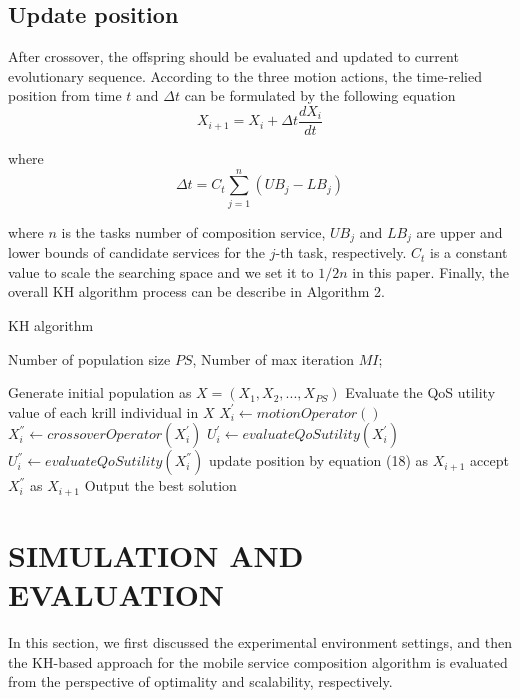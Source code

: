 \documentclass[10pt,journal,compsoc]{IEEEtran}
\begin{document}
\subsection{Update position}
After crossover, the offspring should be evaluated and updated to current evolutionary sequence.
According to the three motion actions, the time-relied position from time $t$ and $\Delta t$ can be formulated by the following equation
\begin{equation}
X_{i+1} = X_i + \Delta t \frac{dX_i}{dt}
\end{equation}

where
\begin{equation}
\Delta t = C_t\sum_{j=1}^{n}(UB_j - LB_j)
\end{equation}

where $n$ is the tasks number of composition service, $UB_j$ and $LB_j$ are upper and lower bounds of candidate services for the $j$-th task, respectively. $C_t$ is a constant value to scale the searching space and we set it to $1/2n$ in this paper. Finally, the overall KH algorithm process can be describe in Algorithm 2.

\begin{algorithm}
\caption{KH algorithm}
\label{alg2}
\begin{algorithmic}[1]

\REQUIRE Number of population size $PS$, Number of max iteration $MI$;

\STATE Generate initial population as $X = (X_1, X_2, ..., X_{PS})$
\STATE Evaluate the QoS utility value of each krill individual in $X$
		\STATE $X_i^{'} \leftarrow motionOperator()$
		\STATE $X_i^{''} \leftarrow crossoverOperator(X_i^{'})$
		\STATE $U_i^{'} \leftarrow evaluateQoSutility(X_i^{'})$
		\STATE $U_i^{''} \leftarrow evaluateQoSutility(X_i^{''})$
			\STATE update position by equation (18) as $X_{i+1}$
		\ELSE
			\STATE accept $X_i^{''}$ as $X_{i+1}$
		\ENDIF
	\ENDFOR
\ENDFOR
\STATE Output the best solution
\end{algorithmic}
\end{algorithm}

\section{SIMULATION AND EVALUATION}
In this section, we first discussed the experimental environment settings, and then the KH-based approach for the mobile service composition algorithm is evaluated from the perspective of optimality and scalability, respectively.
\end{document}
